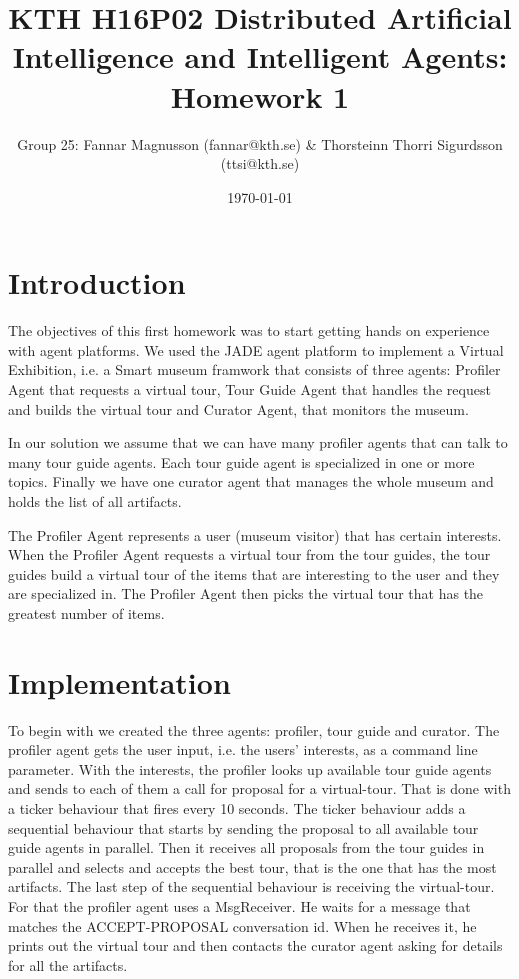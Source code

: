 \documentclass[a4paper, 11pt]{article}
\title{KTH H16P02 Distributed Artificial Intelligence and Intelligent Agents: Homework 1}
\author{Group 25: Fannar Magnusson (fannar@kth.se) & Thorsteinn Thorri Sigurdsson (ttsi@kth.se)}
\date{\today{}}
\begin{document}
\maketitle

\section{Introduction}

The objectives of this first homework was to start getting hands on experience with agent platforms. We used the JADE agent platform to implement a Virtual Exhibition, i.e. a Smart museum framwork that consists of three agents: Profiler Agent that requests a virtual tour, Tour Guide Agent that handles the request and builds the virtual tour and Curator Agent, that monitors the museum.
    
In our solution we assume that we can have many profiler agents that can talk to many tour guide agents. Each tour guide agent is specialized in one or more topics. Finally we have one curator agent that manages the whole museum and holds the list of all artifacts.

The Profiler Agent represents a user (museum visitor) that has certain interests. When the Profiler Agent requests a virtual tour from the tour guides, the tour guides build a virtual tour of the items that are interesting to the user and they are specialized in. The Profiler Agent then picks the virtual tour that has the greatest number of items.

\section{Implementation}

To begin with we created the three agents: profiler, tour guide and curator. The profiler agent gets the user input, i.e. the users' interests, as a command line parameter. With the interests, the profiler looks up available tour guide agents and sends to each of them a call for proposal for a virtual-tour. That is done with a ticker behaviour that fires every 10 seconds. The ticker behaviour adds a sequential behaviour that starts by sending the proposal to all available tour guide agents in parallel. Then it receives all proposals from the tour guides in parallel and selects and accepts the best tour, that is the one that has the most artifacts. The last step of the sequential behaviour is receiving the virtual-tour. For that the profiler agent uses a MsgReceiver. He waits for a message that matches the ACCEPT-PROPOSAL conversation id. When he receives it, he prints out the virtual tour and then contacts the curator agent asking for details for all the artifacts.  
\end{document}
